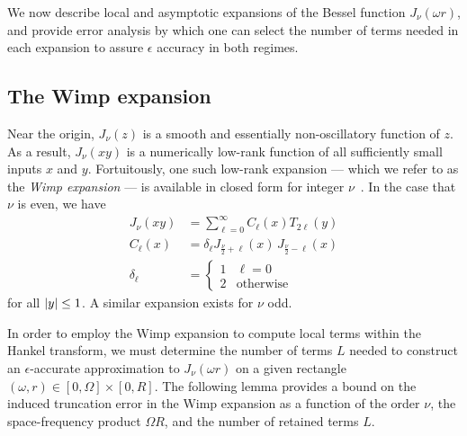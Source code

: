 We now describe local and asymptotic expansions of the Bessel function
$J_\nu(\omega r)$, and provide error analysis by which one can select the number
of terms needed in each expansion to assure $\epsilon$ accuracy in both regimes.

\subsection{The Wimp expansion}\label{sec:local}

Near the origin, $J_\nu(z)$ is a smooth and essentially non-oscillatory function
of $z$. As a result, $J_\nu(xy)$ is a numerically low-rank function of all
sufficiently small inputs $x$ and $y$. Fortuitously, one such low-rank expansion
--- which we refer to as the \textit{Wimp expansion} --- is available in closed
form for integer $\nu$~\cite{wimp1962polynomial}. In the case that $\nu$ is
even, we have
\begin{equation}
    \begin{aligned}
        J_\nu(xy) 
        &= \sum_{\ell=0}^\infty C_\ell(x) T_{2\ell}(y) \\
        C_\ell(x) 
        &= \delta_\ell J_{\frac{\nu}{2} + \ell}(x) \, J_{\frac{\nu}{2} - \ell}(x) \\
        \delta_\ell 
        &= \begin{cases}
            1 & \ell=0 \\
            2 & \text{otherwise}
        \end{cases}
    \end{aligned}
\end{equation}
for all $\left|y\right| \leq 1$. A similar expansion exists for $\nu$ odd.

In order to employ the Wimp expansion to compute local terms within the Hankel
transform, we must determine the number of terms $L$ needed to construct an
$\epsilon$-accurate approximation to $J_\nu(\omega r)$ on a given rectangle
$(\omega, r) \in [0, \Omega] \times [0, R]$. The following lemma provides a
bound on the induced truncation error in the Wimp expansion as a function of the
order $\nu$, the space-frequency product $\Omega R$, and the number of retained
terms $L$.

